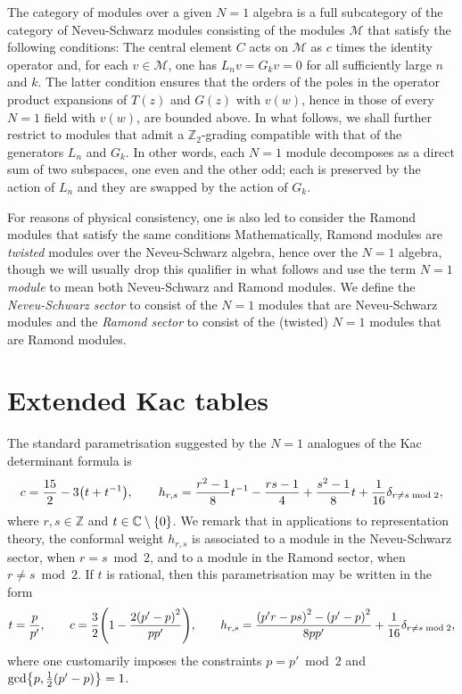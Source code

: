 \documentclass[a4paper,reqno,12pt]{report}
\theoremstyle{definition}
\numberwithin{equation}{section}
\let\originalleft\left     %
\let\originalright\right
\renewcommand{\left}{\mathopen{}\mathclose\bgroup\originalleft}
\renewcommand{\right}{\aftergroup\egroup\originalright}
\newcommand{\brac}[1]{\left( #1 \right)}
\newcommand{\set}[1]{\left\{ #1 \right\}}
\newcommand{\ZZ}{\mathbb{Z}}
\newcommand{\CC}{\mathbb{C}}
\newcommand{\opes}{operator product expansions}
\newcommand{\ns}{Neveu-Schwarz}
\theoremstyle{plain}
\newcommand{\Mod}[1]{\mathcal{#1}}                 %
\begin{document}
The category of modules over a given $N=1$ algebra is a full subcategory of the category of \ns{} modules consisting of the modules $\Mod{M}$ that satisfy the following conditions:  The central element $C$ acts on $\Mod{M}$ as $c$ times the identity operator and, for each $v \in \Mod{M}$, one has $L_n v = G_k v = 0$ for all sufficiently large $n$ and $k$.  The latter condition ensures that the orders of the poles in the \opes{} of $T(z)$ and $G(z)$ with $v(w)$, hence in those of every $N=1$ field with $v(w)$, are bounded above.  In what follows, we shall further restrict to modules that admit a $\ZZ_2$-grading compatible with that of the generators $L_n$ and $G_k$.  In other words, each $N=1$ module decomposes as a direct sum of two subspaces, one even and the other odd; each is preserved by the action of $L_n$ and they are swapped by the action of $G_k$.

For reasons of physical consistency, one is also led to consider the Ramond modules that satisfy the same conditions  Mathematically, Ramond modules are \emph{twisted} modules over the \ns{} algebra, hence over the $N=1$ algebra, though we will usually drop this qualifier in what follows and use the term \emph{$N=1$ module} to mean both \ns{} and Ramond modules.  We define the \emph{\ns{} sector} to consist of the $N=1$ modules that are \ns{} modules and the \emph{Ramond sector} to consist of the (twisted) $N=1$ modules that are Ramond modules.



\section{Extended Kac tables} \label{sec:KacTables}

The standard parametrisation suggested by the $N=1$ analogues \cite{KacCon79,FriSup85,MeuHig86} of the Kac determinant formula is
\begin{equation}
c = \frac{15}{2} - 3 \brac{t+t^{-1}}, \qquad 
h_{r,s} = \frac{r^2-1}{8} t^{-1} - \frac{rs-1}{4} + \frac{s^2-1}{8} t + \frac{1}{16} \delta_{r \neq s \bmod{2}},
\end{equation}
where $r,s \in \ZZ$ and $t \in \CC \setminus \set{0}$.  We remark that in applications to representation theory, the conformal weight $h_{r,s}$ is associated to a module in the \ns{} sector, when $r=s \bmod{2}$, and to a module in the Ramond sector, when $r \neq s \bmod{2}$.  If $t$ is rational, then this parametrisation may be written in the form
\begin{equation} \label{eq:ParByt}
t = \frac{p}{p'}, \qquad 
c = \frac{3}{2} \brac{1 - \frac{2 \brac{p'-p}^2}{pp'}}, \qquad 
h_{r,s} = \frac{\brac{p'r-ps}^2 - \brac{p'-p}^2}{8pp'} + \frac{1}{16} \delta_{r \neq s \bmod{2}},
\end{equation}
where one customarily imposes the constraints $p=p' \bmod{2}$ and $\gcd \set{p, \frac{1}{2} \brac{p'-p}} = 1$.
\end{document}
